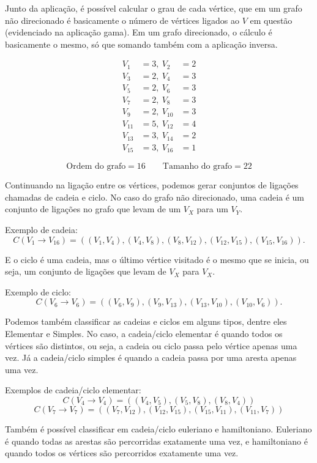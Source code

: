 Junto da aplicação, é possível calcular o grau de cada vértice, que em um grafo não direcionado é basicamente o número de vértices ligados ao $V$ em questão (evidenciado na aplicação gama).
Em um grafo direcionado, o cálculo é basicamente o mesmo, só que somando também com a aplicação inversa.

\[
	\begin{aligned}
		V_1    & = 3, \
		V_2    & = 2     \\
		V_3    & = 2, \
		V_4    & = 3     \\
		V_5    & = 2, \
		V_6    & = 3     \\
		V_7    & = 2, \
		V_8    & = 3     \\
		V_9    & = 2, \
		V_{10} & = 3     \\
		V_{11} & = 5, \
		V_{12} & = 4     \\
		V_{13} & = 3,\
		V_{14} & = 2     \\
		V_{15} & = 3,\
		V_{16} & = 1
	\end{aligned}
\]

\[
	\text{Ordem do grafo} = 16 \qquad \text{Tamanho do grafo} = 22
\]

Continuando na ligação entre os vértices, podemos gerar conjuntos de ligações chamadas de cadeia e ciclo.
No caso do grafo não direcionado, uma cadeia é um conjunto de ligações no grafo que levam de um $V_X$ para um $V_Y$.

Exemplo de cadeia:
\[
	C(V_1 \rightarrow V_{16}) = ((V_1,V_4),(V_4,V_8),(V_8,V_{12}),(V_{12},V_{15}),(V_{15},V_{16})).
\]

E o ciclo é uma cadeia, mas o último vértice visitado é o mesmo que se inicia, ou seja, um conjunto de ligações que levam de $V_X$ para $V_X$.

Exemplo de ciclo:
\[
	C(V_6 \rightarrow V_6) = ((V_6,V_9),(V_9,V_{13}),(V_{13},V_{10}),(V_{10},V_6)).
\]

Podemos também classificar as cadeias e ciclos em alguns tipos, dentre eles Elementar e Simples.
No caso, a cadeia/ciclo elementar é quando todos os vértices são distintos, ou seja, a cadeia ou ciclo passa pelo vértice apenas uma vez.
Já a cadeia/ciclo simples é quando a cadeia passa por uma aresta apenas uma vez.

Exemplos de cadeia/ciclo elementar:
\[
	C(V_4 \rightarrow V_4) = ((V_4,V_5),(V_5,V_8),(V_8,V_4))
\]
\[
	C(V_7 \rightarrow V_7) = ((V_7,V_{12}),(V_{12},V_{15}),(V_{15},V_{11}),(V_{11},V_7))
\]

Também é possível classificar em cadeia/ciclo euleriano e hamiltoniano.
Euleriano é quando todas as arestas são percorridas exatamente uma vez, e hamiltoniano é quando todos os vértices são percorridos exatamente uma vez.

